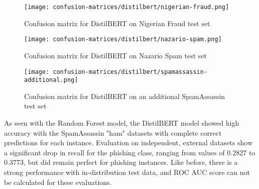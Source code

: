 \begin{figure}[H]
  \begin{center}
    \texttt{[image: confusion-matrices/distilbert/nigerian-fraud.png]}
    \caption{Confusion matrix for DistilBERT on Nigerian Fraud test set}
  \end{center}
\end{figure}

\begin{figure}[H]
  \begin{center}
    \texttt{[image: confusion-matrices/distilbert/nazario-spam.png]}
    \caption{Confusion matrix for DistilBERT on Nazario Spam test set}
  \end{center}
\end{figure}

\begin{figure}[H]
  \begin{center}
    \texttt{[image: confusion-matrices/distilbert/spamassassin-additional.png]}
    \caption{Confusion matrix for DistilBERT on an additional SpamAssassin test set}
  \end{center}
\end{figure}

\noindent As seen with the Random Forest model, the DistilBERT model showed high accuracy with the SpamAssassin "ham" datasets with complete correct predictions for each instance. Evaluation on independent, external datasets show a significant drop in recall for the phishing class, ranging from values of 0.2827 to 0.3773, but did remain perfect for phishing instances. Like before, there is a strong performance with in-distribution test data, and ROC AUC score can not be calculated for these evaluations.
